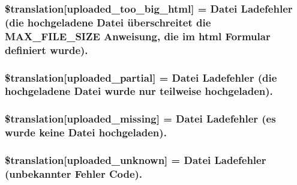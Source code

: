 \subsubsection[{\$translation}]{\setlength{\rightskip}{0pt plus 5cm}\$translation\mbox{[}\textquotesingle{}uploaded\+\_\+too\+\_\+big\+\_\+html\textquotesingle{}\mbox{]} = \textquotesingle{}Datei Ladefehler (die hochgeladene Datei überschreitet die M\+A\+X\+\_\+\+F\+I\+L\+E\+\_\+\+S\+I\+Z\+E Anweisung, die im html Formular definiert wurde).\textquotesingle{}}\label{class_8upload_8de___d_e_8php_a623d5b8b92169f57d7e43458aa911cbb}
\hypertarget{class_8upload_8de___d_e_8php_a967c17da21b0a2d3bd65cca3a9ca0ea8}{}
\subsubsection[{\$translation}]{\setlength{\rightskip}{0pt plus 5cm}\$translation\mbox{[}\textquotesingle{}uploaded\+\_\+partial\textquotesingle{}\mbox{]} = \textquotesingle{}Datei Ladefehler (die hochgeladene Datei wurde nur teilweise hochgeladen).\textquotesingle{}}\label{class_8upload_8de___d_e_8php_a967c17da21b0a2d3bd65cca3a9ca0ea8}
\hypertarget{class_8upload_8de___d_e_8php_a0cce433260be65f1f35853a6b4b8952b}{}
\subsubsection[{\$translation}]{\setlength{\rightskip}{0pt plus 5cm}\$translation\mbox{[}\textquotesingle{}uploaded\+\_\+missing\textquotesingle{}\mbox{]} = \textquotesingle{}Datei Ladefehler (es wurde keine Datei hochgeladen).\textquotesingle{}}\label{class_8upload_8de___d_e_8php_a0cce433260be65f1f35853a6b4b8952b}
\hypertarget{class_8upload_8de___d_e_8php_a4a9168e922b827e6a28b5db1c00774ca}{}
\subsubsection[{\$translation}]{\setlength{\rightskip}{0pt plus 5cm}\$translation\mbox{[}\textquotesingle{}uploaded\+\_\+unknown\textquotesingle{}\mbox{]} = \textquotesingle{}Datei Ladefehler (unbekannter Fehler Code).\textquotesingle{}}\label{class_8upload_8de___d_e_8php_a4a9168e922b827e6a28b5db1c00774ca}
\hypertarget{class_8upload_8de___d_e_8php_a3afc377bd803683314f413a814243066}{}
